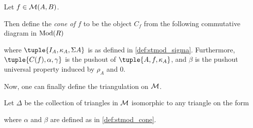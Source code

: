 \begin{definition}
    \label{def:stmod_cone}
    Let \( f \in {\mathcal{M}}(A, B) \).
    
    Then define the \emph{cone of \( f \)} to be the object \( C_f \) from the following commutative diagram in \( \operatorname{Mod}(R) \)
    \begin{center}
    \end{center}
    where \( \tuple{I_A, \kappa_A, \Sigma A} \) is as defined in \autoref{def:stmod_sigma}. Furthermore, \( \tuple{C(f), \alpha, \gamma} \) is the pushout of \( \tuple{A, f, \kappa_A} \), and \( \beta \) is the pushout universal property induced by \( \rho_A \) and \( 0 \).
\end{definition}

Now, one can finally define the triangulation on \( {\mathcal{M}} \).

\begin{definition}
    Let \( \Delta \) be the collection of triangles in \( {\mathcal{M}} \) isomorphic to any triangle on the form
    \begin{center}
    \end{center}
    where \( \alpha \) and \( \beta \) are defined as in \autoref{def:stmod_cone}.
\end{definition}

